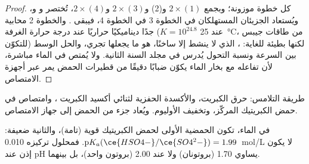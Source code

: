 \begin{proof}
كل خطوة موزونة؛ وبجمع $2\times(1)$ و(2) و$2\times(3)$
و$2\times(4)$، تُختصر  و و، ويُستعاد الجزيئان
 المستهلكان في الخطوة 3 في الخطوة 4، فيبقى
. والخطوة 2 محابية جدًا ديناميكيًا حراريًا
عند درجة حرارة الغرفة ($K = 10^{24.8}$ عند \qty{25}{\celsius}، من
طاقات جيبس للتكوّن) لكنها بطيئة للغاية: ، الذي لا ينشط
إلا ساخنًا، هو ما يجعلها تجري، والحل الوسط بين السرعة
ونسبة التحول يُدرس في مجلد السنة الثانية. ولا يُمتص  في
الماء مباشرة، لأن تفاعله مع بخار الماء يكوّن ضبابًا دقيقًا
من قطيرات الحمض يمر عبر أجهزة الامتصاص.
\end{proof}

\begin{omfigure}

{\small طريقة التلامس: حرق الكبريت، والأكسدة الحفزية لثنائي أكسيد الكبريت
، وامتصاص  في حمض الكبريتيك المركّز،
وتخفيف الأوليوم. ويُعاد جزء من الحمض إلى جهاز الامتصاص.}
\end{omfigure}

\begin{proposition}\label{prop:b1:p-block-16-18:sulfuric-strength}
في الماء، تكون الحمضية الأولى لحمض الكبريتيك قوية (تامة)،
والثانية ضعيفة: $\mathrm{p}K_a(\ce{HSO4-}/\ce{SO4^2-}) = 1.99$. فمحلول
تركيزه \qty{0.010}{mol/L} لا يكون إذن عند pH يساوي 1.70 (بروتونان) ولا
عند 2.00 (بروتون واحد)، بل بينهما.
\end{proposition}

